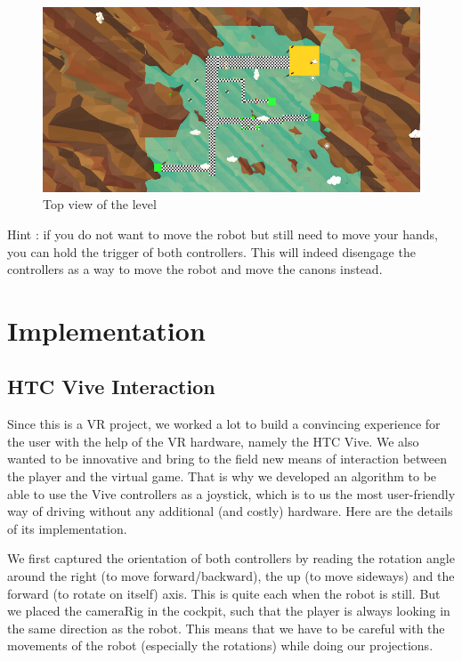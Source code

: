 \documentclass[12pt]{article}
\begin{document}
\begin{figure}[!h]
   \caption{\label{étiquette} Top view of the level}
   \includegraphics[scale=0.53]{images/topview.png}
\end{figure}

Hint : if you do not want to move the robot but still need to move your hands, you can hold the trigger of both controllers. This will indeed disengage the controllers as a way to move the robot and move the canons instead.

\section{Implementation}

\subsection{HTC Vive Interaction}

Since this is a VR project, we worked a lot to build a convincing experience for the user with the help of the VR hardware, namely the HTC Vive. We also wanted to be innovative and bring to the field new means of interaction between the player and the virtual game. That is why we developed an algorithm to be able to use the Vive controllers as a joystick, which is to us the most user-friendly way of driving without any additional (and costly) hardware. Here are the details of its implementation.

We first captured the orientation of both controllers by reading the rotation angle around the right (to move forward/backward), the up (to move sideways) and the forward (to rotate on itself) axis. This is quite each when the robot is still. But we placed the cameraRig in the cockpit, such that the player is always looking in the same direction as the robot. This means that we have to be careful with the movements of the robot (especially the rotations) while doing our projections.
\end{document}
